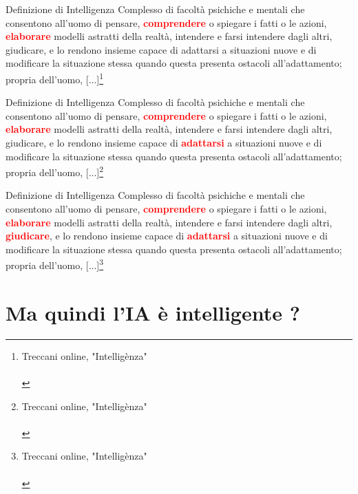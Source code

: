 \documentclass{beamer}
\begin{document}
\begin{frame}{Definizione di Intelligenza}
Complesso di facoltà psichiche e mentali che consentono all’uomo di pensare, \textcolor{red}{\textbf{comprendere}} o spiegare i fatti o le azioni, \textcolor{red}{\textbf{elaborare}} modelli astratti della realtà, intendere e farsi intendere dagli altri, giudicare, e lo rendono insieme capace di adattarsi a situazioni nuove e di modificare la situazione stessa quando questa presenta ostacoli all’adattamento; propria dell’uomo, [...]\footnote[1]{Treccani online, "Intellig\`enza"\\ \ \\}
\end{frame}

\begin{frame}{Definizione di Intelligenza}
Complesso di facoltà psichiche e mentali che consentono all’uomo di pensare, \textcolor{red}{\textbf{comprendere}} o spiegare i fatti o le azioni, \textcolor{red}{\textbf{elaborare}} modelli astratti della realtà, intendere e farsi intendere dagli altri, giudicare, e lo rendono insieme capace di \textcolor{red}{\textbf{adattarsi}} a situazioni nuove e di modificare la situazione stessa quando questa presenta ostacoli all’adattamento; propria dell’uomo, [...]\footnote[1]{Treccani online, "Intellig\`enza"\\ \ \\}
\end{frame}

\begin{frame}{Definizione di Intelligenza}
Complesso di facoltà psichiche e mentali che consentono all’uomo di pensare, \textcolor{red}{\textbf{comprendere}} o spiegare i fatti o le azioni, \textcolor{red}{\textbf{elaborare}} modelli astratti della realtà, intendere e farsi intendere dagli altri, \colorbox{yellow!70}{\textcolor{red}{\textbf{giudicare}}}, e lo rendono insieme capace di \textcolor{red}{\textbf{adattarsi}} a situazioni nuove e di modificare la situazione stessa quando questa presenta ostacoli all’adattamento; propria dell’uomo, [...]\footnote[1]{Treccani online, "Intellig\`enza"\\ \ \\}
\end{frame}

\section{Ma quindi l'IA è intelligente ?}
\end{document}
